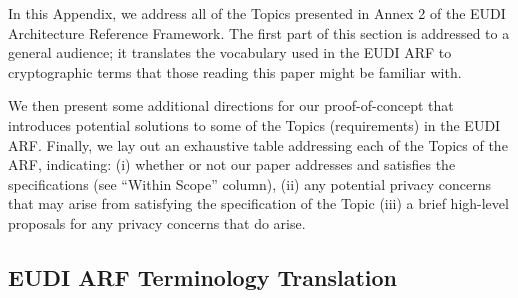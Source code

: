 



In this Appendix, we address all of the Topics presented in Annex 2 of the EUDI Architecture Reference Framework. 
The first part of this section is addressed to a general audience; it translates the vocabulary used in the EUDI ARF to cryptographic terms that those reading this paper might be familiar with.

We then present some additional directions for our proof-of-concept that introduces potential solutions to some of the Topics (requirements) in the EUDI ARF.
Finally, we lay out an exhaustive table addressing each of the Topics of the ARF, indicating:
(i) whether or not our paper addresses and satisfies the specifications (see ``Within Scope'' column),
(ii) any potential privacy concerns that may arise from satisfying the specification of the Topic
(iii) a brief high-level proposals for any privacy concerns that do arise.

\subsection{EUDI ARF Terminology Translation}


